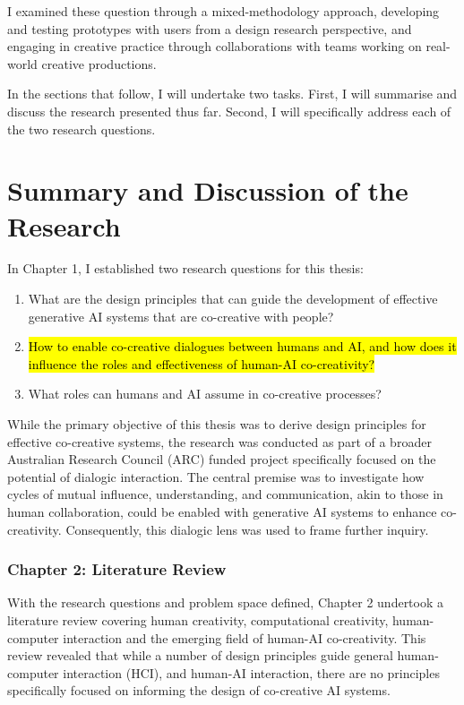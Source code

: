 I examined these question through a mixed-methodology approach, developing and testing prototypes with users from a design research perspective, and engaging in creative practice through collaborations with teams working on real-world creative productions.

In the sections that follow, I will undertake two tasks. First, I will summarise and discuss the research presented thus far. Second, I will specifically address each of the two research questions.  

\section{Summary and Discussion of the Research}

In Chapter 1, I established two research questions for this thesis:

\begin{enumerate}
    \item What are the design principles that can guide the development of effective generative AI systems that are co-creative with people?
    \item \hl{How to enable co-creative dialogues between humans and AI, and how does it influence the roles and effectiveness of human-AI co-creativity?}
    \item What roles can humans and AI assume in co-creative processes?
\end{enumerate}

While the primary objective of this thesis was to derive design principles for effective co-creative systems, the research was conducted as part of a broader Australian Research Council (ARC) funded project specifically focused on the potential of dialogic interaction. The central premise was to investigate how cycles of mutual influence, understanding, and communication, akin to those in human collaboration, could be enabled with generative AI systems to enhance co-creativity. Consequently, this dialogic lens was used to frame further inquiry.

\subsubsection{\textbf{Chapter 2: Literature Review}}

With the research questions and problem space defined, Chapter 2 undertook a literature review covering human creativity, computational creativity, human-computer interaction and the emerging field of human-AI co-creativity. This review revealed that while a number of design principles guide general human-computer interaction (HCI), and human-AI interaction, there are no principles specifically focused on informing the design of co-creative AI systems.

